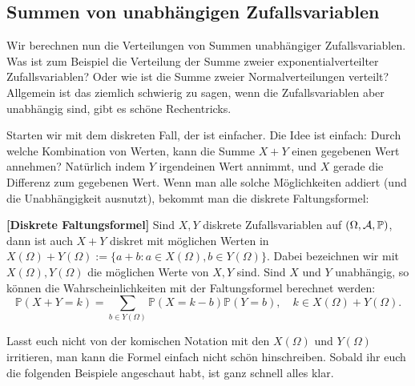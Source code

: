 \subsection{Summen von unabhängigen Zufallsvariablen}\label{sec:summen}
Wir berechnen nun die Verteilungen von Summen unabhängiger Zufallsvariablen. Was ist zum Beispiel die Verteilung der Summe zweier exponentialverteilter Zufallsvariablen? Oder wie ist die Summe zweier Normalverteilungen verteilt? Allgemein ist das ziemlich schwierig zu sagen, wenn die Zufallsvariablen aber unabh\"angig sind, gibt es sch\"one Rechentricks.\smallskip

Starten wir mit dem diskreten Fall, der ist einfacher. Die Idee ist einfach: Durch welche Kombination von Werten, kann die Summe $X+Y$ einen gegebenen Wert annehmen? Nat\"urlich indem $Y$ irgendeinen Wert annimmt, und $X$ gerade die Differenz zum gegebenen Wert. Wenn man alle solche M\"oglichkeiten addiert (und die Unabh\"angigkeit ausnutzt), bekommt man die diskrete Faltungsformel:
\begin{satz}\label{diskreteFaltung}
 \textbf{[Diskrete Faltungsformel]}
	Sind $X,Y$ diskrete Zufallsvariablen auf $(\Omega, \mathcal{A}, \mathbb{P})$, dann ist auch $X+Y$ diskret mit m\"oglichen Werten in $X(\Omega)+Y(\Omega):=\{a+b: a\in X(\Omega), b\in Y(\Omega)\}$. Dabei bezeichnen wir mit $X(\Omega), Y(\Omega)$ die m\"oglichen Werte von $X,Y$ sind. Sind $X$ und $Y$ unabh\"angig, so k\"onnen die Wahrscheinlichkeiten mit der Faltungsformel berechnet werden:
	\[ \mathbb{P}(X+Y = k) = \sum\limits_{b \in Y(\Omega)} \mathbb{P}(X = k-b) \mathbb{P}(Y=b),\quad k\in X(\Omega)+Y(\Omega).
	\]
\end{satz}
Lasst euch nicht von der komischen Notation mit den $X(\Omega)$ und $Y(\Omega)$ irritieren, man kann die Formel einfach nicht sch\"on hinschreiben. Sobald ihr euch die folgenden Beispiele angeschaut habt, ist ganz schnell alles klar.
